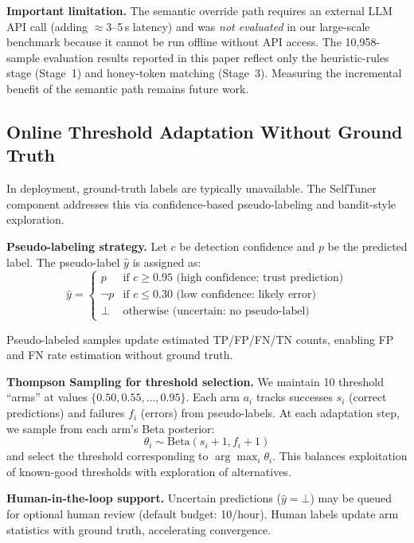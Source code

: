 \documentclass[manuscript,screen,review]{acmart}
\begin{document}
\textbf{Important limitation.} The semantic override path requires an external LLM API call (adding $\approx$3--5\,s latency) and was \emph{not evaluated} in our large-scale benchmark because it cannot be run offline without API access. The 10{,}958-sample evaluation results reported in this paper reflect only the heuristic-rules stage (Stage~1) and honey-token matching (Stage~3). Measuring the incremental benefit of the semantic path remains future work.

\subsection{Online Threshold Adaptation Without Ground Truth}
\label{sec:online-adaptation}

In deployment, ground-truth labels are typically unavailable. The SelfTuner component addresses this via confidence-based pseudo-labeling and bandit-style exploration.

\textbf{Pseudo-labeling strategy.} Let $c$ be detection confidence and $p$ be the predicted label. The pseudo-label $\hat{y}$ is assigned as:
\begin{equation}
\hat{y} = \begin{cases}
p & \text{if } c \geq 0.95 \text{ (high confidence: trust prediction)} \\
\neg p & \text{if } c \leq 0.30 \text{ (low confidence: likely error)} \\
\bot & \text{otherwise (uncertain: no pseudo-label)}
\end{cases}
\end{equation}

Pseudo-labeled samples update estimated TP/FP/FN/TN counts, enabling FP and FN rate estimation without ground truth.

\textbf{Thompson Sampling for threshold selection.} We maintain 10 threshold ``arms'' at values $\{0.50, 0.55, \ldots, 0.95\}$. Each arm $a_i$ tracks successes $s_i$ (correct predictions) and failures $f_i$ (errors) from pseudo-labels. At each adaptation step, we sample from each arm's Beta posterior:
\begin{equation}
\theta_i \sim \mathrm{Beta}(s_i + 1, f_i + 1)
\end{equation}
and select the threshold corresponding to $\arg\max_i \theta_i$. This balances exploitation of known-good thresholds with exploration of alternatives.

\textbf{Human-in-the-loop support.} Uncertain predictions ($\hat{y} = \bot$) may be queued for optional human review (default budget: 10/hour). Human labels update arm statistics with ground truth, accelerating convergence.
\end{document}
